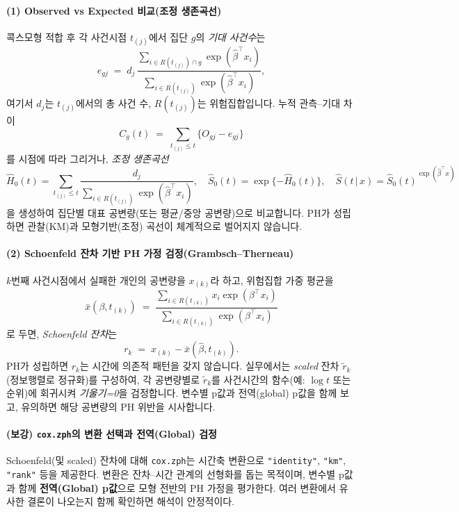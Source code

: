 \documentclass{article}
\begin{document}
\paragraph{(1) Observed vs Expected 비교(조정 생존곡선)}
콕스모형 적합 후 각 사건시점 $t_{(j)}$에서 집단 $g$의 \emph{기대 사건수}는
\[
e_{gj} \;=\; d_j\,
\frac{\sum_{i\in R(t_{(j)})\cap g} \exp(\hat\beta^\top x_i)}{\sum_{i\in R(t_{(j)})} \exp(\hat\beta^\top x_i)},
\]
여기서 $d_j$는 $t_{(j)}$에서의 총 사건 수, $R(t_{(j)})$는 위험집합입니다.
누적 관측--기대 차이
\[
C_g(t) \;=\; \sum_{t_{(j)}\le t}\{O_{gj}-e_{gj}\}
\]
를 시점에 따라 그리거나, \emph{조정 생존곡선}
\[
\hat H_0(t)=\sum_{t_{(j)}\le t}\frac{d_j}{\sum_{i\in R(t_{(j)})}\exp(\hat\beta^\top x_i)},\quad
\hat S_0(t)=\exp\{-\hat H_0(t)\},\quad
\hat S(t\,|\,x)=\hat S_0(t)^{\exp(\hat\beta^\top x)}
\]
을 생성하여 집단별 대표 공변량(또는 평균/중앙 공변량)으로 비교합니다.
PH가 성립하면 관찰(KM)과 모형기반(조정) 곡선이 체계적으로 벌어지지 않습니다.

\paragraph{(2) Schoenfeld 잔차 기반 PH 가정 검정(Grambsch--Therneau)}
$k$번째 사건시점에서 실패한 개인의 공변량을 $x_{(k)}$라 하고, 위험집합 가중 평균을
\[
\bar x(\beta,t_{(k)}) \;=\; 
\frac{\sum_{i\in R(t_{(k)})} x_i \exp(\beta^\top x_i)}
{\sum_{i\in R(t_{(k)})} \exp(\beta^\top x_i)}
\]
로 두면, \emph{Schoenfeld 잔차}는
\[
r_k \;=\; x_{(k)} - \bar x(\hat\beta,t_{(k)}).
\]
PH가 성립하면 $r_k$는 시간에 의존적 패턴을 갖지 않습니다.
실무에서는 \emph{scaled} 잔차 $\tilde r_k$(정보행렬로 정규화)를 구성하여, 각 공변량별로 $\tilde r_k$를 사건시간의 함수(예: $\log t$ 또는 순위)에 회귀시켜 \emph{기울기=0}을 검정합니다.
변수별 p값과 전역(global) p값을 함께 보고, 유의하면 해당 공변량의 PH 위반을 시사합니다.

\paragraph{(보강) \texttt{cox.zph}의 변환 선택과 전역(Global) 검정}
Schoenfeld(및 scaled) 잔차에 대해 \texttt{cox.zph}는 시간축 변환으로 \texttt{"identity"}, \texttt{"km"}, \texttt{"rank"} 등을 제공한다.
변환은 잔차--시간 관계의 선형화를 돕는 목적이며, 변수별 p값과 함께 \textbf{전역(Global) p값}으로 모형 전반의 PH 가정을 평가한다.
여러 변환에서 유사한 결론이 나오는지 함께 확인하면 해석이 안정적이다.
\end{document}

